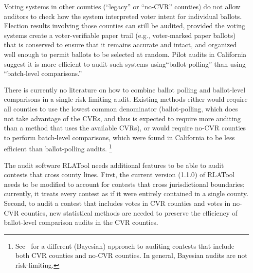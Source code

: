 \documentclass[runningheads]{llncs}
\begin{document}
Voting systems in other counties (``legacy'' or ``no-CVR'' counties) 
do not allow auditors to check how the system
interpreted voter intent for individual ballots.
Election results involving those counties can still be audited, provided the voting systems
create a voter-verifiable paper trail (e.g., voter-marked paper ballots) that is
conserved to ensure that it remains accurate and intact, and organized well enough
to permit ballots to be selected at random.
Pilot audits in California \cite{CA_SOS_EAC} suggest it is more efficient to audit such systems
using``ballot-polling'' \cite{lindemanEtal12,lindemanStark12} than using ``batch-level comparisons.''

There is currently no literature on how to combine
ballot polling and ballot-level comparisons in a single risk-limiting audit.
Existing methods either would require all counties to use the lowest
common denominator (ballot-polling, which does not take advantage of the CVRs,
and thus is expected to require more auditing than a method that uses the available CVRs),
 or would require no-CVR counties to perform batch-level comparisons, which were found in
California to be less efficient than ballot-polling audits.%
\footnote{%
  See~\cite{Rivest-2018-bayesian-tabulation-audits}
  for a different (Bayesian) approach to auditing contests that include both CVR counties
  and no-CVR counties. In general, Bayesian audits are not risk-limiting.
}

The audit software RLATool needs additional features to be able to audit
contests that cross county lines.
First, the current version (1.1.0) of RLATool
needs to be modified to account for contests that cross jurisdictional
boundaries; currently, it treats every contest as if it were entirely
contained in a single county.
Second, to audit a contest that includes votes in CVR counties
and votes in no-CVR counties, new statistical methods are needed to
preserve the efficiency of ballot-level comparison audits in the CVR counties.

\end{document}
